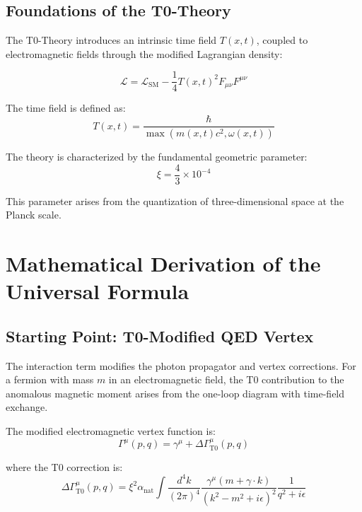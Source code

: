\documentclass[12pt,a4paper]{article}
\newcommand{\xipar}{\xi}
\newcommand{\alphaNAT}{\alpha_{\text{nat}}}
\newcommand{\calL}{\mathcal{L}}
\begin{document}
	\subsection{Foundations of the T0-Theory}
	
	The T0-Theory introduces an intrinsic time field \( T(x,t) \), coupled to electromagnetic fields through the modified Lagrangian density:
	
	\begin{equation}
		\calL = \calL_{\text{SM}} - \frac{1}{4}T(x,t)^2 F_{\mu\nu}F^{\mu\nu}
	\end{equation}
	
	The time field is defined as:
	\begin{equation}
		T(x,t) = \frac{\hbar}{\max(m(x,t)c^2, \omega(x,t))}
	\end{equation}
	
	The theory is characterized by the fundamental geometric parameter:
	\begin{equation}
		\xipar = \frac{4}{3} \times 10^{-4}
	\end{equation}
	
	This parameter arises from the quantization of three-dimensional space at the Planck scale.
	
	\section{Mathematical Derivation of the Universal Formula}
	
	\subsection{Starting Point: T0-Modified QED Vertex}
	
	The interaction term modifies the photon propagator and vertex corrections. For a fermion with mass \( m \) in an electromagnetic field, the T0 contribution to the anomalous magnetic moment arises from the one-loop diagram with time-field exchange.
	
	The modified electromagnetic vertex function is:
	\begin{equation}
		\Gamma^\mu(p,q) = \gamma^\mu + \Delta\Gamma^\mu_{\text{T0}}(p,q)
	\end{equation}
	
	where the T0 correction is:
	\begin{equation}
		\Delta\Gamma^\mu_{\text{T0}}(p,q) = \xipar^2 \alphaNAT \int \frac{d^4k}{(2\pi)^4} \frac{\gamma^\mu (m + \gamma \cdot k)}{(k^2 - m^2 + i\epsilon)^2} \frac{1}{q^2 + i\epsilon}
	\end{equation}
	
\end{document}
